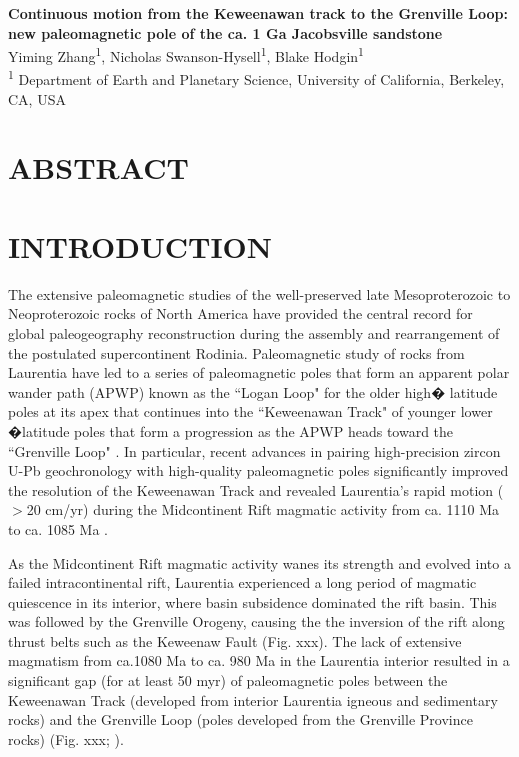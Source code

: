 \documentclass[11pt,letterpaper]{article}
\begin{document}
\begin{flushleft}

{\Large \textbf{Continuous motion from the Keweenawan track to the Grenville Loop: new paleomagnetic pole of the ca. 1 Ga Jacobsville sandstone}}
\\
\singlespacing
 Yiming Zhang\textsuperscript{1}, Nicholas Swanson-Hysell\textsuperscript{1}, Blake Hodgin\textsuperscript{1}\\
\bigskip
\textsuperscript{1} Department of Earth and Planetary Science, University of California, Berkeley, CA, USA\\

\smallskip
\end{flushleft}


\section*{ABSTRACT}


\section*{INTRODUCTION}

The extensive paleomagnetic studies of the well-preserved late Mesoproterozoic to Neoproterozoic rocks of North America have provided the central record for global paleogeography reconstruction during the assembly and rearrangement of the postulated supercontinent Rodinia. Paleomagnetic study of rocks from Laurentia have led to a series of paleomagnetic poles that form an apparent polar wander path (APWP) known as the ``Logan Loop" for the older high� latitude poles at its apex that continues into the ``Keweenawan Track" of younger lower �latitude poles that form a progression as the APWP heads toward the ``Grenville Loop" \citep{Swanson-Hysell2019a}. In particular, recent advances in pairing high-precision zircon U-Pb geochronology with high-quality paleomagnetic poles significantly improved the resolution of the Keweenawan Track and revealed Laurentia's rapid motion ($>$20 cm/yr) during the Midcontinent Rift magmatic activity from ca. 1110 Ma to ca. 1085 Ma \citep{Swanson-Hysell2019a}. 

As the Midcontinent Rift magmatic activity wanes its strength and evolved into a failed intracontinental rift, Laurentia experienced a long period of magmatic quiescence in its interior, where basin subsidence dominated the rift basin. This was followed by the Grenville Orogeny, causing the the inversion of the rift along thrust belts such as the Keweenaw Fault (Fig. xxx). The lack of extensive magmatism from ca.1080 Ma to ca. 980 Ma in the Laurentia interior resulted in a significant gap (for at least 50 myr) of paleomagnetic poles between the Keweenawan Track (developed from interior Laurentia igneous and sedimentary rocks) and the Grenville Loop (poles developed from the Grenville Province rocks) (Fig. xxx; \cite{Swanson-Hysell2019a}).  
\end{document}
